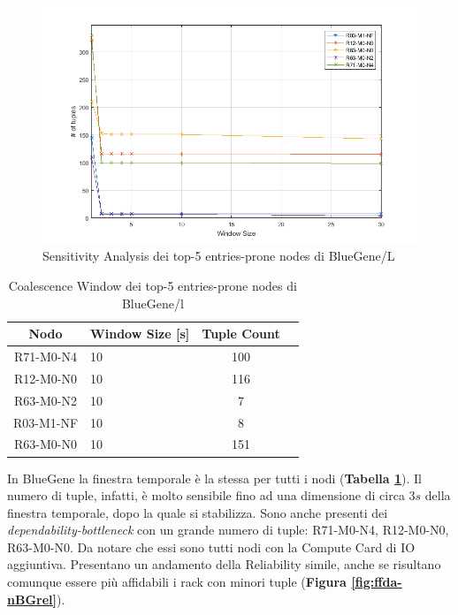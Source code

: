 		\begin{figure}[H]
			\centering
			\includegraphics[scale=0.7]{./immagine/nodiBGcwin.png}
			\caption{Sensitivity Analysis dei top-5 entries-prone nodes di BlueGene/L}
			\label{fig:ffda-nBGcwin}
		\end{figure}
	
		\begin{table}
			\footnotesize
			\caption{Coalescence Window dei top-5 entries-prone nodes di BlueGene/l}
			\label{tab:ffda-nBGcwin}
			\centering
			\begin{tabular}{clcc}
				\toprule
				\textbf{Nodo} &
				\textbf{Window Size [s]} &
				\textbf{Tuple Count}\\
				\midrule
				R71-M0-N4 &
				10 &
				100\\
				\midrule
				R12-M0-N0 &
				10 &
				116\\
				\midrule
				R63-M0-N2 &
				10 &
				7\\
				\midrule
				R03-M1-NF &
				10 &
				8\\
				\midrule
				R63-M0-N0 &
				10 &
				151\\
				\bottomrule			
			\end{tabular}
		\end{table}
	
		In BlueGene la finestra temporale è la stessa per tutti i nodi (\textbf{Tabella \ref{tab:ffda-nBGcwin}}). Il numero di tuple, infatti, è molto sensibile fino ad una dimensione di circa $3s$ della finestra temporale, dopo la quale si stabilizza. Sono anche presenti dei \emph{dependability-bottleneck} con un grande numero di tuple: R71-M0-N4, R12-M0-N0, R63-M0-N0. Da notare che essi sono tutti nodi con la Compute Card di IO aggiuntiva. Presentano un andamento della Reliability simile, anche se risultano comunque essere più affidabili i rack con minori tuple (\textbf{Figura \ref{fig:ffda-nBGrel}}).
	
